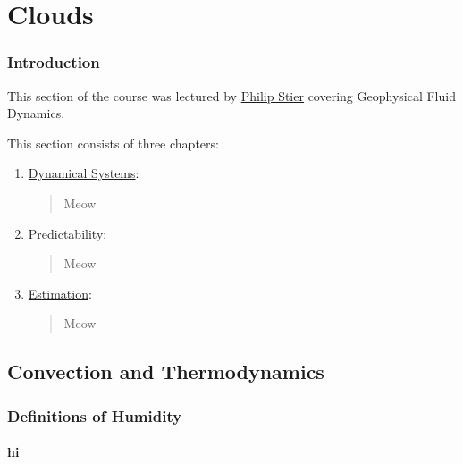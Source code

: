 \part{Clouds}\label{Clouds}

\section*{Introduction}

This section of the course was lectured by \href{https://www.physics.ox.ac.uk/our-people/stier}{Philip Stier} covering Geophysical Fluid Dynamics.\vspace{5 mm}

\noindent This section consists of three chapters:\vspace{5 mm}

\begin{enumerate}
    \item \hyperref[Dynamical Systems]{Dynamical Systems}: 
        
        \begin{quote}
            Meow
        \end{quote}

    \item \hyperref[Predictability]{Predictability}: 
    
        \begin{quote}
            Meow
        \end{quote}
    
    \item \hyperref[Estimation]{Estimation}:
        
        \begin{quote}
            Meow
        \end{quote}
\end{enumerate}

\chapter{Convection and Thermodynamics}\label{Convection Clouds}

\section{Definitions of Humidity}

\subsection{hi}

